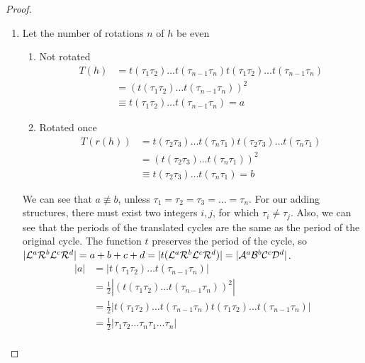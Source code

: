
\begin{proof}
	\begin{enumerate}
		\item Let the number of rotations $n$ of $h$ be even
		      \begin{enumerate}[label=\alph*)]
			      \item Not rotated
			            \begin{align*}
				            T(h) & = t(\tau_1\tau_2) \dots t(\tau_{n-1}\tau_n) t(\tau_1\tau_2) \dots t(\tau_{n-1}\tau_n) \\
				                 & = (t(\tau_1\tau_2) \dots t(\tau_{n-1}\tau_n))^2                                       \\
				                 & \equiv t(\tau_1\tau_2) \dots t(\tau_{n-1}\tau_n) = a
			            \end{align*}
			      \item Rotated once
			            \begin{align*}
				            T(r(h)) & = t(\tau_2\tau_3) \dots t(\tau_{n}\tau_1) t(\tau_2\tau_3) \dots t(\tau_{n}\tau_1) \\
				                    & = (t(\tau_2\tau_3) \dots t(\tau_{n}\tau_1))^2                                     \\
				                    & \equiv t(\tau_2\tau_3) \dots t(\tau_{n}\tau_1) = b
			            \end{align*}
		      \end{enumerate}
		      We can see that $a \nequiv b$, unless $\tau_1 = \tau_2 = \tau_3 = \dots = \tau_n$.
		      For our adding structures, there must exist two integers $i, j$, for which $\tau_i \neq \tau_j$.
		      Also, we can see that the periods of the translated cycles are the same as the period of the original cycle.
		      The function $t$ preserves the period of the cycle, so $|\mathcal{L}^a\mathcal{R}^b\mathcal{L}^c\mathcal{R}^d| = a + b + c + d = |t(\mathcal{L}^a\mathcal{R}^b\mathcal{L}^c\mathcal{R}^d)| = |\mathcal{A}^a\mathcal{B}^b\mathcal{C}^c\mathcal{D}^d|$.
		      \begin{align*}
			      |a| & = |t(\tau_1\tau_2) \dots t(\tau_{n-1}\tau_n)|                                                       \\
			          & = \frac{1}{2} |(t(\tau_1\tau_2) \dots t(\tau_{n-1}\tau_n))^2|                                       \\
			          & = \frac{1}{2} |t(\tau_1\tau_2) \dots t(\tau_{n-1}\tau_n) t(\tau_1\tau_2) \dots t(\tau_{n-1}\tau_n)| \\
			          & = \frac{1}{2} |\tau_1\tau_2 \dots \tau_n\tau_1 \dots \tau_n|                                        \\

\end{align*}
\end{enumerate}
\end{proof}
